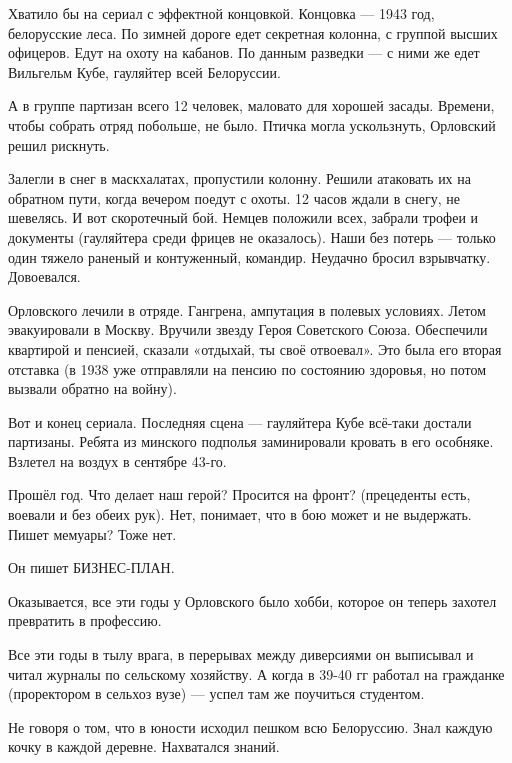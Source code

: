 Хватило бы на сериал с эффектной концовкой. Концовка — 1943 год, белорусские леса. По зимней дороге едет секретная колонна, с группой высших офицеров. Едут на охоту на кабанов. По данным разведки — с ними же едет Вильгельм Кубе, гауляйтер всей Белоруссии.

А в группе партизан всего 12 человек, маловато для хорошей засады. Времени, чтобы собрать отряд побольше, не было. Птичка могла ускользнуть, Орловский решил рискнуть.

Залегли в снег в маскхалатах, пропустили колонну. Решили атаковать их на обратном пути, когда вечером поедут с охоты. 12 часов ждали в снегу, не шевелясь. И вот скоротечный бой. Немцев положили всех, забрали трофеи и документы (гауляйтера среди фрицев не оказалось). Наши без потерь — только один тяжело раненый и контуженный, командир. Неудачно бросил взрывчатку. Довоевался.

Орловского лечили в отряде. Гангрена, ампутация в полевых условиях. Летом эвакуировали в Москву. Вручили звезду Героя Советского Союза. Обеспечили квартирой и пенсией, сказали «отдыхай, ты своё отвоевал». Это была его вторая отставка (в 1938 уже отправляли на пенсию по состоянию здоровья, но потом вызвали обратно на войну).

Вот и конец сериала. Последняя сцена — гауляйтера Кубе всё-таки достали партизаны. Ребята из минского подполья заминировали кровать в его особняке. Взлетел на воздух в сентябре 43-го.

Прошёл год. Что делает наш герой? Просится на фронт? (прецеденты есть, воевали и без обеих рук). Нет, понимает, что в бою может и не выдержать. Пишет мемуары? Тоже нет.

Он пишет БИЗНЕС-ПЛАН.

Оказывается, все эти годы у Орловского было хобби, которое он теперь захотел превратить в профессию.

Все эти годы в тылу врага, в перерывах между диверсиями он выписывал и читал журналы по сельскому хозяйству.
А когда в 39-40 гг работал на гражданке (проректором в сельхоз вузе) — успел там же поучиться студентом.

Не говоря о том, что в юности исходил пешком всю Белоруссию. Знал каждую кочку в каждой деревне. Нахватался знаний.

